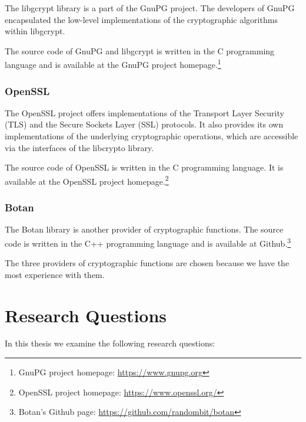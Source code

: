 The libgcrypt library is a part of the GnuPG project.
The developers of GnuPG encapsulated the low-level implementations of the cryptographic algorithms within libgcrypt.

The source code of GnuPG and libgcrypt is written in the C programming language and is available at the GnuPG project homepage.\footnote{GnuPG project homepage: \url{https://www.gnupg.org}}

  \subsubsection{OpenSSL}

The OpenSSL project offers implementations of the Transport Layer Security (TLS) and the Secure Sockets Layer (SSL) protocols.
It also provides its own implementations of the underlying cryptographic operations, which are accessible via the interfaces of the libcrypto library.

The source code of OpenSSL is written in the C programming language.
It is available at the OpenSSL project homepage.\footnote{OpenSSL project homepage: \url{https://www.openssl.org/}}

  \subsubsection{Botan}

The Botan library is another provider of cryptographic functions.
The source code is written in the C++ programming language and is available at Github.\footnote{Botan's Github page: \url{https://github.com/randombit/botan}}

The three providers of cryptographic functions are chosen because we have the most experience with them.

\section{Research Questions}
\label{researchq}

In this thesis we examine the following research questions:



